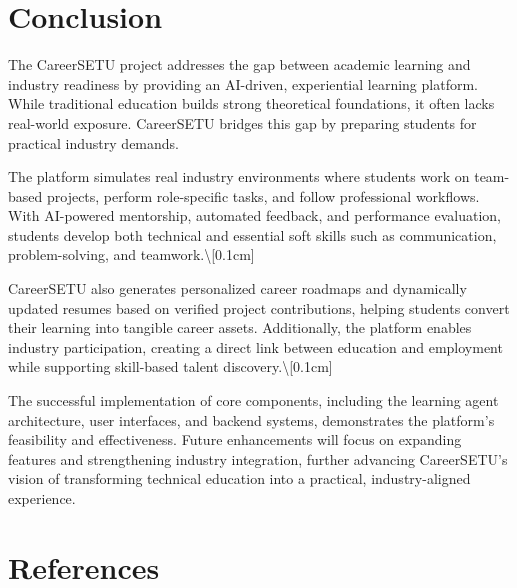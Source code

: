 \documentclass[12pt,a4paper]{report}
\begin{document}
\chapter{Conclusion}

The CareerSETU project addresses the gap between academic learning and industry readiness by providing an AI-driven, experiential learning platform. While traditional education builds strong theoretical foundations, it often lacks real-world exposure. CareerSETU bridges this gap by preparing students for practical industry demands. 

The platform simulates real industry environments where students work on team-based projects, perform role-specific tasks, and follow professional workflows. With AI-powered mentorship, automated feedback, and performance evaluation, students develop both technical and essential soft skills such as communication, problem-solving, and teamwork.\textbackslash{}[0.1cm]

CareerSETU also generates personalized career roadmaps and dynamically updated resumes based on verified project contributions, helping students convert their learning into tangible career assets. Additionally, the platform enables industry participation, creating a direct link between education and employment while supporting skill-based talent discovery.\textbackslash{}[0.1cm]

The successful implementation of core components, including the learning agent architecture, user interfaces, and backend systems, demonstrates the platform’s feasibility and effectiveness. Future enhancements will focus on expanding features and strengthening industry integration, further advancing CareerSETU’s vision of transforming technical education into a practical, industry-aligned experience.


\newpage
\chapter*{References}
\end{document}
